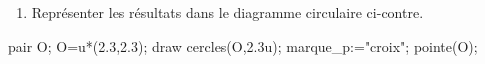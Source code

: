 \begin{enigme}
\begin{minipage}{0.7\linewidth}
\begin{enumerate}
                \item Représenter les résultats dans le diagramme circulaire ci-contre.
            \end{enumerate}
        \end{minipage}
        \hfill
        \begin{minipage}{0.2\linewidth}
            \vspace*{-10mm}
            \begin{Geometrie}[CoinHD={(4.6u,4.6u)}]                
                pair O;
                O=u*(2.3,2.3);
                draw cercles(O,2.3u);
                marque_p:="croix";
                pointe(O);            
            \end{Geometrie}
        \end{minipage}       
\end{enigme}  
%     
